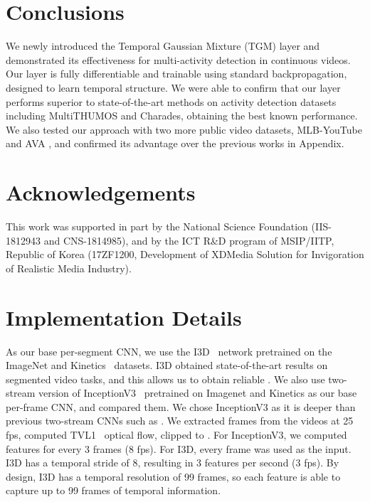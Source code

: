 \documentclass{article}
\begin{document}
\section{Conclusions}
\vspace{-4pt}

We newly introduced the Temporal Gaussian Mixture (TGM) layer and demonstrated its effectiveness for multi-activity detection in continuous videos. Our layer is fully differentiable and trainable using standard backpropagation, designed to learn temporal structure. We were able to confirm that our layer performs superior to state-of-the-art methods on activity detection datasets including MultiTHUMOS and Charades, obtaining the best known performance.  We also tested our approach with two more public video datasets, MLB-YouTube \citep{mlbyoutube2018} and AVA \citep{ava2017}, and confirmed its advantage over the previous works in Appendix.

\section*{Acknowledgements} This work was supported in part by the National Science Foundation (IIS-1812943 and CNS-1814985), and by the ICT R\&D program of MSIP/IITP, Republic of Korea (17ZF1200, Development of XDMedia Solution for Invigoration of Realistic Media Industry).







\clearpage
\newpage

\appendix


\section{Implementation Details}

As our base per-segment CNN, we use the I3D~\citep{carreira2017quo} network pretrained on the ImageNet and Kinetics~\citep{kay2017kinetics} datasets. I3D obtained state-of-the-art results on segmented video tasks, and this allows us to obtain reliable . We also use two-stream version of InceptionV3~\citep{szegedy2016rethinking} pretrained on Imagenet and Kinetics as our base per-frame CNN, and compared them. We chose InceptionV3 as it is deeper than previous two-stream CNNs such as \citep{simonyan2014two,feichtenhofer2016convolutional}. We extracted frames from the videos at 25 fps, computed TVL1~\citep{zach2007duality} optical flow, clipped to . For InceptionV3, we computed features for every 3 frames (8 fps). For I3D, every frame was used as the input. I3D has a temporal stride of 8, resulting in 3 features per second (3 fps). By design, I3D has a temporal resolution of 99 frames, so each feature is able to capture up to 99 frames of temporal information.
\end{document}
